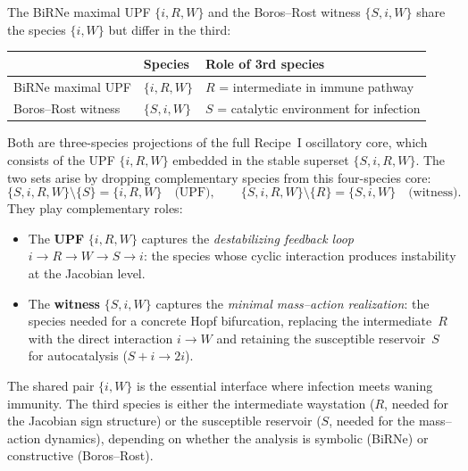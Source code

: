 \begin{remark}\label{rem:complement}
The BiRNe maximal UPF $\{i,R,W\}$ and the Boros--Rost witness
$\{S,i,W\}$ share the species $\{i,W\}$ but differ in the third:

\begin{center}
\begin{tabular}{lll}
 & \textbf{Species} & \textbf{Role of 3rd species} \\
\hline
BiRNe maximal UPF & $\{i,R,W\}$ & $R$ = intermediate in immune pathway \\
Boros--Rost witness & $\{S,i,W\}$ & $S$ = catalytic environment for infection \\
\end{tabular}
\end{center}

Both are three-species projections of the full Recipe~I oscillatory core,
which consists of the UPF $\{i,R,W\}$ embedded in the stable superset
$\{S,i,R,W\}$.
The two sets arise by dropping complementary species from this
four-species core:
\[
\{S,i,R,W\} \setminus \{S\} = \{i,R,W\} \quad\text{(UPF)},
\qquad
\{S,i,R,W\} \setminus \{R\} = \{S,i,W\} \quad\text{(witness)}.
\]
They play complementary roles:
\begin{itemize}[nosep]
\item The \textbf{UPF} $\{i,R,W\}$ captures the \emph{destabilizing feedback
  loop} $i\to R\to W\to S\to i$: the species whose cyclic interaction
  produces instability at the Jacobian level.
\item The \textbf{witness} $\{S,i,W\}$ captures the \emph{minimal
  mass--action realization}: the species needed for a concrete Hopf
  bifurcation, replacing the intermediate~$R$ with the direct
  interaction $i\to W$ and retaining the susceptible reservoir~$S$
  for autocatalysis ($S+i\to 2i$).
\end{itemize}
The shared pair $\{i,W\}$ is the essential interface where infection meets
waning immunity.
The third species is either the intermediate waystation ($R$, needed for
the Jacobian sign structure) or the susceptible reservoir ($S$, needed for
the mass--action dynamics), depending on whether the analysis is symbolic
(BiRNe) or constructive (Boros--Rost).
\end{remark}

%
%
%
%
%
%
%
